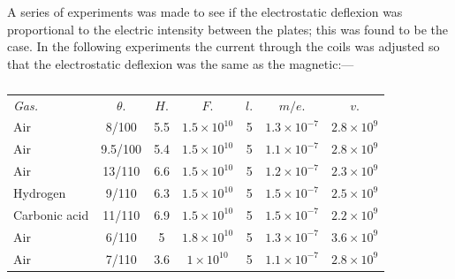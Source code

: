 A series of experiments was made to see if the electrostatic deflexion
was proportional to the electric intensity between the plates; this was
found to be the case. In the following experiments the current through
the coils was adjusted so that the electrostatic deflexion was the same
as the magnetic:---
\begin{table}[htp]\label{tbl:thomson_air}
\caption{}
\label{tbl:thomson_1}
\centering
\begin{tabular}{l*{6}{c}} %
\toprule
\addlinespace[2pt]
\emph{Gas.} & $\theta.$ & $H.$ & $F.$ & $l.$ & $m/e.$ & $v.$\\
\cmidrule(lr){1-1}\cmidrule(lr){2-2}\cmidrule(lr){3-3}\cmidrule(lr){4-4}\cmidrule(lr){5-5}\cmidrule(lr){6-6}\cmidrule(lr){7-7}
\addlinespace[2pt]
Air           & 8/100   & 5.5 & $1.5\!\times\!{10^{10}}$ & 5 & $1.3\!\times\!{10^{-7}}$ & $2.8\!\times\!{10^9}$\\
Air           & 9.5/100 & 5.4 & $1.5\!\times\!{10^{10}}$ & 5 & $1.1\!\times\!{10^{-7}}$ & $2.8\!\times\!{10^9}$\\
Air           & 13/110  & 6.6 & $1.5\!\times\!{10^{10}}$ & 5 & $1.2\!\times\!{10^{-7}}$ & $2.3\!\times\!{10^9}$\\
Hydrogen      & 9/110   & 6.3 & $1.5\!\times\!{10^{10}}$ & 5 & $1.5\!\times\!{10^{-7}}$ & $2.5\!\times\!{10^9}$\\
Carbonic acid & 11/110  & 6.9 & $1.5\!\times\!{10^{10}}$ & 5 & $1.5\!\times\!{10^{-7}}$ & $2.2\!\times\!{10^9}$\\
Air           & 6/110   & 5   & $1.8\!\times\!{10^{10}}$ & 5 & $1.3\!\times\!{10^{-7}}$ & $3.6\!\times\!{10^9}$\\
Air           & 7/110   & 3.6 & $1\!\times\!{10^{10}}$   & 5 & $1.1\!\times\!{10^{-7}}$ & $2.8\!\times\!{10^9}$\\
\bottomrule
\end{tabular}
\end{table}

